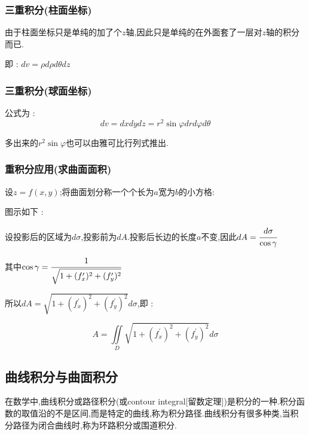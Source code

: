 \documentclass[UTF8,12pt]{ctexbook}
\newcommand{\derivative}{^\prime}
\newcommand{\defFunction}[1]{f(#1)}
\newcommand{\doubleIntegralOnZone}[1]{\iint\limits_{#1}}
\begin{document}
{{{  \subsubsection{三重积分(柱面坐标)}{
    由于柱面坐标只是单纯的加了个$z$轴,因此只是单纯的在外面套了一层对$z$轴的积分而已.

    即 : $dv = \rho d\rho d\theta dz$
  }%

  \subsubsection{三重积分(球面坐标)}{
    公式为 :
    $$
      dv = dxdydz = r^2\sin\varphi drd\varphi d\theta
    $$

    多出来的$r^2\sin\varphi$也可以由雅可比行列式推出.
  }%

  \subsubsection{重积分应用(求曲面面积)}{
    设$z = \defFunction{x,y}$;将曲面划分称一个个长为$a$宽为$b$的小方格:

    图示如下 :
    \begin{center}
    \end{center}

    设投影后的区域为$d\sigma$,投影前为$dA$.投影后长边的长度$a$不变,因此$dA = \cfrac{d\sigma}{\cos\gamma}$

    其中$\cos\gamma = \cfrac{1}{\sqrt{1 + (f\derivative_x)^2 + (f\derivative_y)^2}}$

    所以$dA = \sqrt{1 + (f\derivative_x)^2 + (f\derivative_y)^2}d\sigma$,即 :

    $$
      A = \doubleIntegralOnZone{D}\sqrt{1 + (f\derivative_x)^2 + (f\derivative_y)^2}d\sigma
    $$
  }%


}%

\subsection{曲线积分与曲面积分}{
  在数学中,曲线积分或路径积分(或contour integral[留数定理])是积分的一种.积分函数的取值沿的不是区间,而是特定的曲线,称为积分路径.曲线积分有很多种类,当积分路径为闭合曲线时,称为环路积分或围道积分.

}}}
\end{document}
